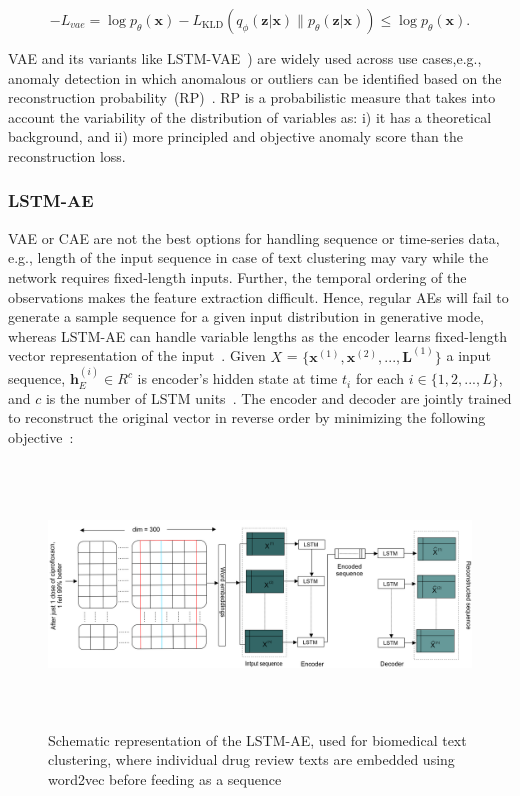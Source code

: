 \begin{equation}
    -L_{vae}=\log p_{\theta}(\mathbf{x})-L_{\mathrm{KLD}}\left(q_{\phi}(\mathbf{z}|\mathbf{x}) \| p_{\theta}(\mathbf{z}|\mathbf{x})\right) \leq \log p_{\theta}(\mathbf{x}). 
    \label{eq:lvae}
\end{equation}

\hspace*{3.5mm} VAE and its variants like LSTM-VAE~\cite{park2018multimodal}) are widely used across use cases,e.g., anomaly detection in which anomalous or outliers can be identified based on the reconstruction probability~(RP)~\cite{an2015variational}. RP is a probabilistic measure that takes into account the variability of the distribution of variables as: i) it has a theoretical background, and ii) more principled and objective anomaly score than the reconstruction loss. 

\subsubsection{LSTM-AE}
VAE or CAE are not the best options for handling sequence or time-series data, e.g., length of the input sequence in case of text clustering may vary while the network requires fixed-length inputs. Further, the temporal ordering of the observations makes the feature extraction difficult. Hence, regular AEs will fail to generate a sample sequence for a given input distribution in generative mode, whereas LSTM-AE can handle variable lengths as the encoder learns fixed-length vector representation of the input~\cite{KarimNCCA2019,karim2019drug}. Given $X$ = $\{\mathbf{x}^{(1)},\mathbf{x}^{(2)}, ..., \mathbf{L}^{(1)}\}$ a input sequence, $\mathbf{h}_E^{(i)} \in {R}^c$ is encoder's hidden state at time $t_i$ for each $i \in \{1,2,...,L\}$, and $c$ is the number of LSTM units~\cite{LSTM_Autoencoder}. The encoder and decoder are jointly trained to reconstruct the original vector in reverse order by minimizing the following objective~\cite{zhu2018hidden}:  

\begin{figure}[h]
	\centering
	\includegraphics[width=\textwidth,height=70mm]{images/lstm_ae_v2.PNG}
    \caption{Schematic representation of the LSTM-AE, used for biomedical text clustering, where individual drug review texts are embedded using word2vec before feeding as a sequence~\cite{karimBIB2019}}	
	\label{fig:lstm_ae}
	\vspace{-2mm} 
\end{figure}

